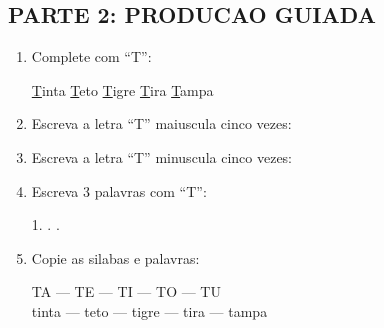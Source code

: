 \begin{exercicio}
\subsection*{PARTE 2: PRODUCAO GUIADA}

\begin{enumerate}[resume]
  \item Complete com ``T'':
  \begin{center}
  \underline{T}inta \quad \underline{T}eto \quad \underline{T}igre \quad \underline{T}ira \quad \underline{T}ampa
  \end{center}

  \item Escreva a letra ``T'' maiuscula cinco vezes:
  \begin{center}
  \underline{\hspace{1.5cm}} \quad \underline{\hspace{1.5cm}} \quad \underline{\hspace{1.5cm}} \quad \underline{\hspace{1.5cm}} \quad \underline{\hspace{1.5cm}}
  \end{center}

  \item Escreva a letra ``T'' minuscula cinco vezes:
  \begin{center}
  \underline{\hspace{1.5cm}} \quad \underline{\hspace{1.5cm}} \quad \underline{\hspace{1.5cm}} \quad \underline{\hspace{1.5cm}} \quad \underline{\hspace{1.5cm}}
  \end{center}

  \item Escreva 3 palavras com ``T'':
  \begin{center}
  1. \underline{\hspace{4cm}} . \underline{\hspace{4cm}} . \underline{\hspace{4cm}}
  \end{center}

  \item Copie as silabas e palavras:
  \begin{center}
  TA --- TE --- TI --- TO --- TU\\
  tinta --- teto --- tigre --- tira --- tampa
  \end{center}
\end{enumerate}


\end{exercicio}
